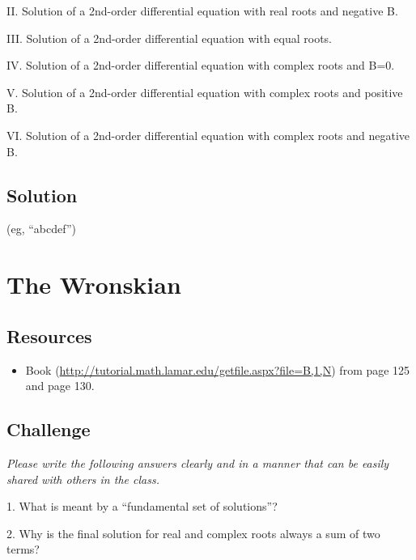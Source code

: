 II. Solution of a 2nd-order differential equation with real roots and negative B.


III. Solution of a 2nd-order differential equation with equal roots.

IV. Solution of a 2nd-order differential equation with complex roots and B=0.

V. Solution of a 2nd-order differential equation with complex roots and positive B.

VI. Solution of a 2nd-order differential equation with complex roots and negative B.

\vspace{1em}

\subsection*{Solution}
(eg, ``abcdef'')





\newpage
\section{The Wronskian}

\subsection*{Resources}
\begin{itemize}
    \item Book (\url{http://tutorial.math.lamar.edu/getfile.aspx?file=B,1,N}) from page 125 and page 130.
\end{itemize}

\subsection*{Challenge}

\emph{Please write the following answers clearly and in a manner that can be easily shared with others in the class.}

1. What is meant by a ``fundamental set of solutions''?

2. Why is the final solution for real and complex roots always a sum of two terms?


